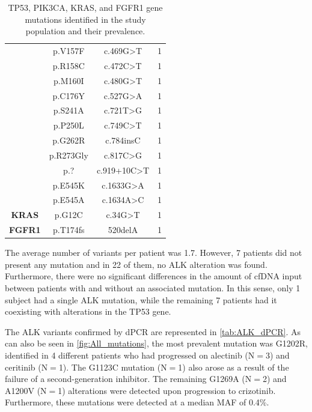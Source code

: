 \begin{table}[t]
{\begin{tabular}{cccc}
\rowcolor[HTML]{FFFFFF} 
\cellcolor[HTML]{FFFFFF} & p.V157F & c.469G\textgreater{}T & 1 \\
\rowcolor[HTML]{EFEFEF} 
\cellcolor[HTML]{FFFFFF} & p.R158C & c.472C\textgreater{}T & 1 \\
\rowcolor[HTML]{FFFFFF} 
\cellcolor[HTML]{FFFFFF} & p.M160I & c.480G\textgreater{}T & 1 \\
\rowcolor[HTML]{EFEFEF} 
\cellcolor[HTML]{FFFFFF} & p.C176Y & c.527G\textgreater{}A & 1 \\
\rowcolor[HTML]{FFFFFF} 
\cellcolor[HTML]{FFFFFF} & p.S241A & c.721T\textgreater{}G & 1 \\
\rowcolor[HTML]{EFEFEF} 
\cellcolor[HTML]{FFFFFF} & p.P250L & c.749C\textgreater{}T & 1 \\
\rowcolor[HTML]{FFFFFF} 
\cellcolor[HTML]{FFFFFF} & p.G262R & c.784insC & 1 \\
\rowcolor[HTML]{EFEFEF} 
\cellcolor[HTML]{FFFFFF} & p.R273Gly & c.817C\textgreater{}G & 1 \\
\rowcolor[HTML]{FFFFFF} 
\multirow{-23}{*}{\cellcolor[HTML]{FFFFFF}\textbf{TP53}}  & p.? & c.919+10C\textgreater{}T & 1 \\
\rowcolor[HTML]{EFEFEF} 
\cellcolor[HTML]{EFEFEF} & p.E545K & c.1633G\textgreater{}A & 1 \\
\rowcolor[HTML]{EFEFEF} 
\multirow{-2}{*}{\cellcolor[HTML]{EFEFEF}\textbf{PIK3CA}} & p.E545A & c.1634A\textgreater{}C & 1 \\
\rowcolor[HTML]{FFFFFF} 
\textbf{KRAS} & p.G12C & c.34G\textgreater{}T & 1 \\
\rowcolor[HTML]{EFEFEF}
\textbf{FGFR1} & p.T174fs & 520delA & 1
\end{tabular}}
\caption{TP53, PIK3CA, KRAS, and FGFR1 gene mutations identified in the study population and their prevalence.}
\label{tab:TP53_Mutations}
\end{table}

The average number of variants per patient was 1.7. However, 7 patients did not present any mutation and in 22 of them, no ALK alteration was found. Furthermore, there were no significant differences in the amount of cfDNA input between patients with and without an associated mutation. In this sense, only 1 subject had a single ALK mutation, while the remaining 7 patients had it coexisting with alterations in the TP53 gene.

The ALK variants confirmed by dPCR are represented in \autoref{tab:ALK_dPCR}. As can also be seen in \autoref{fig:All_mutations}, the most prevalent mutation was G1202R, identified in 4 different patients who had progressed on alectinib (N$=$3) and ceritinib (N$=$1). The G1123C mutation (N$=$1) also arose as a result of the failure of a second-generation inhibitor. The remaining G1269A (N$=$2) and A1200V (N$=$1) alterations were detected upon progression to crizotinib. Furthermore, these mutations were detected at a median MAF of 0.4\%.

